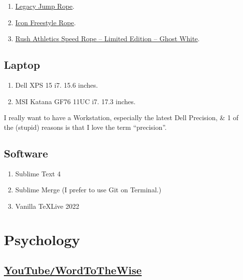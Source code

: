 \documentclass{article}
\begin{document}
\begin{enumerate}
	\item \href{https://www.rushathletics.co.uk/collections/ropes/products/legacy-jump-rope}{Legacy Jump Rope}.
	\item \href{https://www.rushathletics.co.uk/collections/ropes/products/icon-freestyle-rope}{Icon Freestyle Rope}.
	\item \href{https://www.rushathletics.co.uk/collections/ropes/products/rush-athletics-speed-rope-ghost-white}{Rush Athletics Speed Rope -- Limited Edition -- Ghost White}.
\end{enumerate}

\subsection{Laptop}

\begin{enumerate}
	\item {\sc Dell XPS 15 i7.} 15.6 inches.
	\item {\sc MSI Katana GF76 11UC i7.} 17.3 inches.
\end{enumerate}
I really want to have a Workstation, especially the latest {\sc Dell Precision}, \& 1 of the (stupid) reasons is that I love the term ``precision''.

\subsection{Software}

\begin{enumerate}
	\item Sublime Text 4
	\item Sublime Merge (I prefer to use Git on Terminal.)
	\item Vanilla \TeX Live 2022
\end{enumerate}



\section{Psychology}

\subsection{\href{https://www.youtube.com/channel/UCLb_x8TboHIoO0F7uYSl4Ww}{YouTube\texttt{/}WordToTheWise}}
\end{document}
